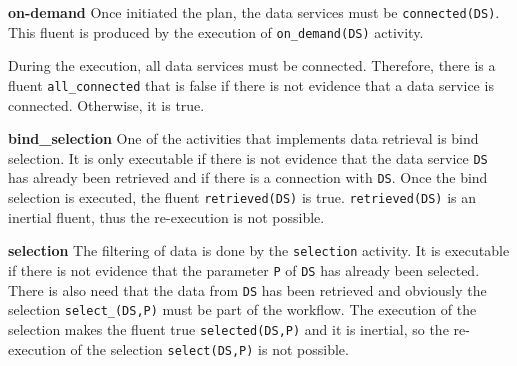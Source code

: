 \documentclass{acm_proc_article-sp}
\begin{document}
\textbf{on-demand} Once initiated the plan, the data services must be \texttt{connected(DS)}. This fluent is produced by the execution of \texttt{on_demand(DS)} activity. 

%



During the execution, all data services must be connected. Therefore, there is a fluent \texttt{all_connected} that is false if there is not evidence that a data service is connected. Otherwise, it is true.

%


     
\textbf{bind_selection} One of the activities that implements data retrieval is bind selection. It is only executable if there is not evidence that the data service \texttt{DS} has already been retrieved and if there is a connection with \texttt{DS}. Once the bind selection is executed, the fluent \texttt{retrieved(DS)} is true. \texttt{retrieved(DS)} is an inertial fluent, thus the re-execution is not possible. 
      
%



\textbf{selection} The filtering of data is done by the \texttt{selection} activity. It is executable if there is not evidence that the parameter \texttt{P} of \texttt{DS} has already been selected. There is also need that the data from \texttt{DS} has been retrieved and obviously the selection \texttt{select_(DS,P)} must be part of the workflow. The execution of the selection makes the fluent true \texttt{selected(DS,P)} and it is inertial, so the re-execution of the selection \texttt{select(DS,P)} is not possible.

%
\end{document}
